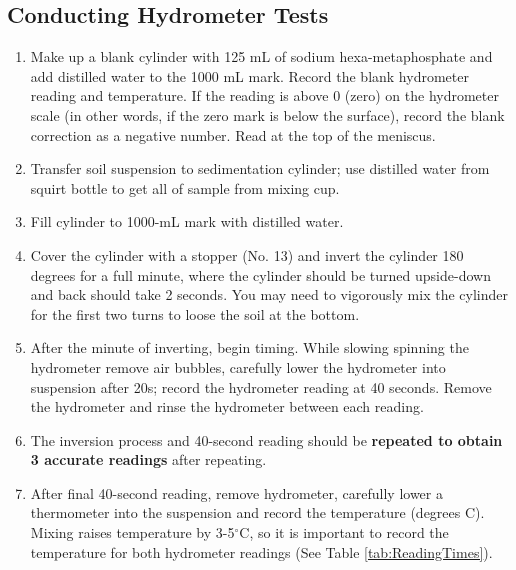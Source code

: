 \documentclass{tufte-handout}
\begin{document}
\subsection{Conducting Hydrometer Tests}

\begin{enumerate}

	\item Make up a blank cylinder with 125 mL of sodium hexa-metaphosphate and add distilled water to the 1000 mL mark.  Record the blank hydrometer reading and temperature. If the reading is above 0 (zero) on the hydrometer scale (in other words, if the zero mark is below the surface), record the blank correction as a negative number.  Read at the top of the meniscus.
	
	\item Transfer soil suspension to sedimentation cylinder; use distilled water from squirt bottle to get all of sample from mixing cup.

	\item Fill cylinder to 1000-mL mark with distilled water.

	\item Cover the cylinder with a stopper (No. 13) and invert the cylinder 180 degrees for a full minute, where the cylinder should be turned upside-down and back should take 2 seconds. You may need to vigorously mix the cylinder for the first two turns to loose the soil at the bottom.
	
	\item After the minute of inverting, begin timing.  While slowing spinning the hydrometer remove air bubbles, carefully lower the hydrometer into suspension after 20s; record the hydrometer reading at 40 seconds. Remove the hydrometer and rinse the hydrometer between each reading. 
	
	\item The inversion process and 40-second reading should be \textbf{repeated to obtain 3  accurate readings} after repeating.

	\item After final 40-second reading, remove hydrometer, carefully lower a thermometer into the suspension and record the temperature (degrees C).  Mixing raises temperature by 3-5$^\circ$C, so it is important to record the temperature for both hydrometer readings (See Table \ref{tab:ReadingTimes}).
	

\end{enumerate}
\end{document}
